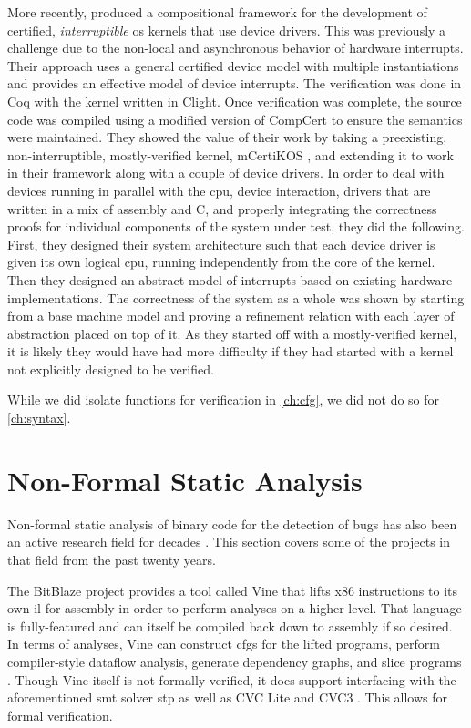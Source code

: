 More recently, \textcite{chen2018compositional} produced a compositional framework
for the development of certified, \emph{interruptible}%
\ac{os} kernels that use device drivers.%
This was previously a challenge due to the non-local and asynchronous behavior
of hardware interrupts. Their approach uses a general certified device model
with multiple instantiations and provides an effective model of device interrupts.
The verification was done in Coq with the kernel written in Clight.
Once verification was complete, the source code was compiled using a modified version
of CompCert to ensure the semantics were maintained.
They showed the value of their work by taking a preexisting,
non-interruptible, mostly-verified kernel, mCertiKOS \autocite{costanzo2016endtoend},
and extending it to work in their framework along with a couple of device drivers.
In order to deal with devices running in parallel with the \ac{cpu},
device interaction, drivers that are written in a mix of assembly and C,
and properly integrating the correctness proofs for individual components
of the system under test, they did the following.
First, they designed their system architecture such that each device driver
is given its own logical \ac{cpu}, running independently from the core of the kernel.
Then they designed an abstract model of interrupts
based on existing hardware implementations.
The correctness of the system as a whole was shown
by starting from a base machine model
and proving a refinement relation with each layer of abstraction placed on top of it.
As they started off with a mostly-verified kernel, it is likely they would have had
more difficulty if they had started with a kernel
not explicitly designed to be verified.
\begin{remark}
  While we did isolate functions for verification in \cref{ch:cfg}, we did not do so for \cref{ch:syntax}.
\end{remark}

\section{Non-Formal Static Analysis}\label{se:static_analysis}
Non-formal static analysis of binary code for the detection of bugs
has also been an active research field for decades
\autocite{kruegel2005automating,brumley2011bap,wang2017angr}.
This section covers some of the projects in that field from the past twenty years.

The BitBlaze project \autocite{song2008bitblaze,BitBlazeWebSite}
provides a tool called Vine that lifts x86 instructions to its own \ac{il} for assembly
in order to perform analyses on a higher level.
That language is fully-featured and can itself be compiled back down to assembly
if so desired.
In terms of analyses, Vine can construct \acp{cfg} for the lifted programs,
perform compiler-style dataflow analysis, generate dependency graphs,
and slice programs \autocite{weiser1981slicing,tip1995survey}.
Though Vine itself is not formally verified,
it does support interfacing with the aforementioned \ac{smt} solver \ac{stp}
as well as CVC Lite \autocite{barrett2004cvcl} and CVC3 \autocite{barrett2007cvc3}.
This allows for formal verification.

